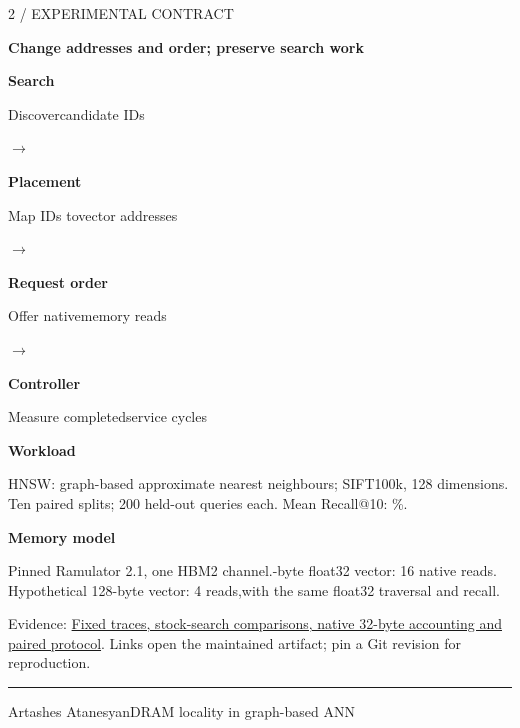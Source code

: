 \documentclass[11pt]{article}
\newenvironment{slide}[2]{%
  \clearpage\color{ink}\fontsize{14}{18}\selectfont
  {\fontsize{10}{12}\selectfont\color{accent}\MakeUppercase{#1}\par}
  {\fontsize{25}{29}\selectfont\bfseries #2\par}\vspace{4pt}
}{%
  \vfill{\color{accent}\hrule}\vspace{4pt}
  {\fontsize{9}{11}\selectfont\color{muted}Artashes Atanesyan\hfill DRAM locality in graph-based ANN\hfill\thepage\par}
}
\newcommand{\evidence}[2]{\vfill{\fontsize{9}{11}\selectfont\color{muted}Evidence: \href{https://github.com/senqx/Thesis-PIM-ANN/blob/main/#1}{#2}. Links open the maintained artifact; pin a Git revision for reproduction.\par}}
\begin{document}
\begin{slide}{2 / Experimental contract}{Change addresses and order; preserve search work}
\vspace{5pt}
\begin{center}\fontsize{13}{17}\selectfont
\colorbox{wash}{\parbox[c][22mm][c]{0.20\linewidth}{\centering\textbf{Search}\par Discover\newline candidate IDs}}
$\rightarrow$
\colorbox{wash}{\parbox[c][22mm][c]{0.20\linewidth}{\centering\textbf{Placement}\par Map IDs to\newline vector addresses}}
$\rightarrow$
\colorbox{wash}{\parbox[c][22mm][c]{0.20\linewidth}{\centering\textbf{Request order}\par Offer native\newline memory reads}}
$\rightarrow$
\colorbox{wash}{\parbox[c][22mm][c]{0.20\linewidth}{\centering\textbf{Controller}\par Measure completed\newline service cycles}}
\end{center}\vspace{10pt}
\begin{minipage}[t]{0.49\linewidth}
\textbf{Workload}\par
HNSW: graph-based approximate nearest neighbours; SIFT100k, 128 dimensions.\newline
Ten paired splits; 200 held-out queries each. Mean Recall@10: \SiftRecall\%.
\end{minipage}\hfill
\begin{minipage}[t]{0.47\linewidth}
\textbf{Memory model}\par
Pinned Ramulator 2.1, one HBM2 channel.-byte float32 vector: 16 native reads.\newline
Hypothetical 128-byte vector: 4 reads,\newline with the same float32 traversal and recall.
\end{minipage}
\evidence{doc/REPRODUCIBILITY.md}{Fixed traces, stock-search comparisons, native 32-byte accounting and paired protocol}
\end{slide}
\end{document}
